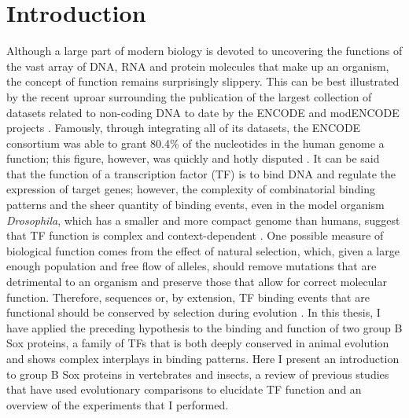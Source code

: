 \chapter{Introduction}

\hrulefill

Although a large part of modern biology is devoted to uncovering the functions of the vast array of DNA, RNA and protein molecules that make up an organism, the concept of function remains surprisingly slippery. This can be best illustrated by the recent uproar surrounding the publication of the largest collection of datasets related to non-coding DNA to date by the ENCODE and modENCODE projects \citep{the_modencode_consortium_identification_2010, dunham_integrated_2012}. Famously, through integrating all of its datasets, the ENCODE consortium was able to grant 80.4\% of the nucleotides in the human genome a function; this figure, however, was quickly and hotly disputed \citep{dunham_integrated_2012,graur_immortality_2013}. It can be said that the function of a transcription factor (TF) is to bind DNA and regulate the expression of target genes; however, the complexity of combinatorial binding patterns and the sheer quantity of binding events, even in the model organism \emph{Drosophila}, which has a smaller and more compact genome than humans, suggest that TF function is complex and context-dependent \citep{biggin_animal_2011,kaplan_quantitative_2011,neph_expansive_2012,zinzen_combinatorial_2009}. One possible measure of biological function comes from the effect of natural selection, which, given a large enough population and free flow of alleles, should remove mutations that are detrimental to an organism and preserve those that allow for correct molecular function. Therefore, sequences or, by extension, TF binding events that are functional should be conserved by selection during evolution \citep{ludwig_functional_2002}. In this thesis, I have applied the preceding hypothesis to the binding and function of two group B Sox proteins, a family of TFs that is both deeply conserved in animal evolution and shows complex interplays in binding patterns. Here I present an introduction to group B Sox proteins in vertebrates and insects, a review of previous studies that have used evolutionary comparisons to elucidate TF function and an overview of the experiments that I performed.  

